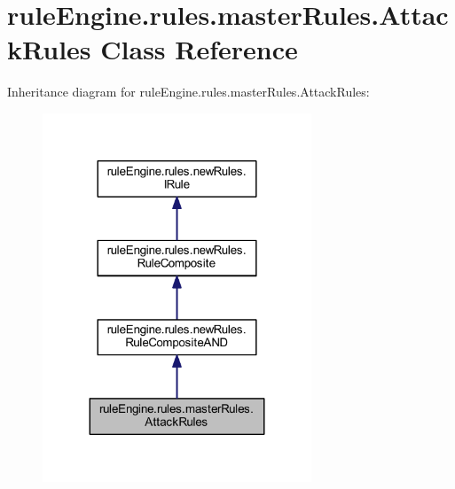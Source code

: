 \hypertarget{classrule_engine_1_1rules_1_1master_rules_1_1_attack_rules}{}\section{rule\+Engine.\+rules.\+master\+Rules.\+Attack\+Rules Class Reference}
\label{classrule_engine_1_1rules_1_1master_rules_1_1_attack_rules}


Inheritance diagram for rule\+Engine.\+rules.\+master\+Rules.\+Attack\+Rules\+:
\nopagebreak
\begin{figure}[H]
\begin{center}
\leavevmode
\includegraphics[width=227pt]{classrule_engine_1_1rules_1_1master_rules_1_1_attack_rules__inherit__graph}
\end{center}
\end{figure}


